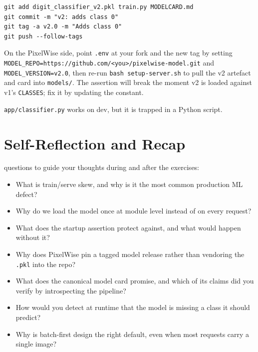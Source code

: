 \begin{verbatim}
git add digit_classifier_v2.pkl train.py MODELCARD.md
git commit -m "v2: adds class 0"
git tag -a v2.0 -m "Adds class 0"
git push --follow-tags
\end{verbatim}

On the PixelWise side, point \texttt{.env} at your fork and the new tag
by setting
\texttt{MODEL\_REPO=https://github.com/<you>/pixelwise-model.git}
and \texttt{MODEL\_VERSION=v2.0}, then re-run
\texttt{bash setup-server.sh} to pull the v2 artefact and card into
\texttt{models/}.
The assertion will break the moment v2 is loaded against v1's
\texttt{CLASSES}; fix it by updating the constant.


\texttt{app/classifier.py} works on dev, but it is trapped in a Python
script.



\newpage
\section{Self-Reflection and Recap}

 questions to guide your thoughts during and after the exercises:
\begin{itemize}
    \item What is train/serve skew, and why is it the most common production ML defect?
    \item Why do we load the model once at module level instead of on every request?
    \item What does the startup assertion protect against, and what would happen without it?
    \item Why does PixelWise pin a tagged model release rather than vendoring the \texttt{.pkl} into the repo?
    \item What does the canonical model card promise, and which of its claims did you verify by introspecting the pipeline?
    \item How would you detect at runtime that the model is missing a class it should predict?
    \item Why is batch-first design the right default, even when most requests carry a single image?
\end{itemize}

